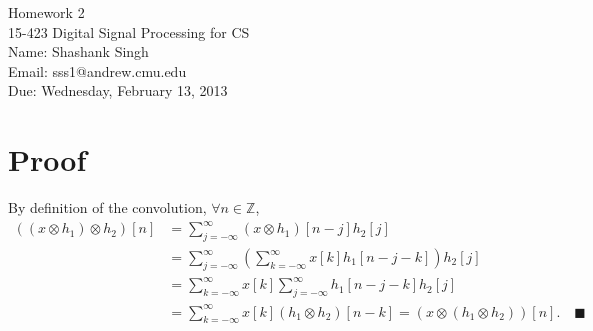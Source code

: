 \documentclass[11pt]{article}
\makeatletter
\newcommand{\myname}{Shashank Singh}
\newcommand{\myandrew}{sss1@andrew.cmu.edu}
\newcommand{\myclass}{15-423 Digital Signal Processing for CS}
\newcommand{\myhwnum}{2}
\newcommand{\duedate}{Wednesday, February 13, 2013}
\newcommand{\mqed}{\quad \blacksquare}
\newcommand{\Z}{\mathbb{Z}} %
\makeatother
\begin{document}
\thispagestyle{plain}

{\Large Homework \myhwnum} \\
\myclass \\
Name: \myname \\
Email: \myandrew \\
Due: \duedate

\section{Proof}
By definition of the convolution,
$\forall n \in \Z$,
\begin{align*}
((x \otimes h_1) \otimes h_2)[n]
 & = \sum_{j = -\infty}^{\infty} (x \otimes h_1)[n - j] h_2[j] \\
 & = \sum_{j = -\infty}^{\infty} \left( \sum_{k = -\infty}^{\infty}
                                         x[k] h_1[n - j - k]\right) h_2[j] \\
 & = \sum_{k = -\infty}^{\infty} x[k] \sum_{j = -\infty}^{\infty}
                                                     h_1[n - j - k] h_2[j] \\
 & = \sum_{k = -\infty}^{\infty} x[k] (h_1 \otimes h_2)[n - k]
   = (x \otimes (h_1 \otimes h_2))[n]. \mqed
\end{align*}
\end{document}
